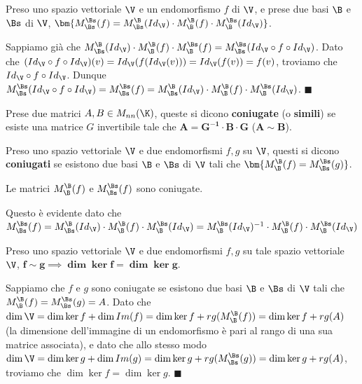 \documentclass[11pt, a4paper, titlepage, oneside]{scrbook}
\begin{document}
\begin{Osservazione}[]
\label{oss-matrice-diagonalizzata-M_C^C(f) = M M M}
Preso uno spazio vettoriale $\V$ e un endomorfismo $f$ di $\V$, e prese due basi $\B$ e $\Bs$ di $\V$, $\bm{M_\Bs^\Bs(f) = M_\Bs^\B(Id_\V) \cdot M_\B^\B(f) \cdot M_\B^\Bs(Id_\V)}$.
\end{Osservazione}

\Dimostrazione \nopagebreak

Sappiamo già che $M_\Bs^\B(Id_\V) \cdot M_\B^\B(f) \cdot M_\B^\Bs(f) = M_\Bs^\Bs(Id_\V \circ f \circ Id_\V)$. Dato che \mbox{$(Id_\V \circ f \circ Id_\V)(v)= Id_\V(f(Id_\V(v))) = Id_\V(f(v)) = f(v)$}, troviamo che $Id_\V \circ f \circ Id_\V$. Dunque $M_\Bs^\Bs(Id_\V \circ f \circ Id_\V) = M_\Bs^\Bs(f) = M_\Bs^\B(Id_\V) \cdot M_\B^\B(f) \cdot M_\B^\Bs(Id_\V)$. $\blacksquare$

\begin{Definizione}
\label{def-matrici-coniugate}
Prese due matrici $A, B \in M_{nn}(\K)$, queste si dicono \textbf{coniugate} (o \textbf{simili}) se esiste una matrice $G$ invertibile tale che $\bm{A = G^{-1} \cdot B \cdot G}$ ($\bm{A \sim B}$).
\end{Definizione}

\begin{Definizione}
\label{def-endomorfismi-coniugati}
Preso uno spazio vettoriale $\V$ e due endomorfismi $f,g$ su $\V$, questi si dicono \textbf{coniugati} se esistono due basi $\B$ e $\Bs$ di $\V$ tali che $\bm{M_\B^\B(f) = M_\Bs^\Bs(g)}$.
\end{Definizione}

\begin{Osservazione}[]
\label{oss-matrici-coniugate}
Le matrici $M_\B^\B(f)$ e $M_\Bs^\Bs(f)$ sono coniugate.
\end{Osservazione}
Questo è evidente dato che $M_\Bs^\Bs(f) = M_\Bs^\B(Id_\V) \cdot M_\B^\B(f) \cdot M_\B^\Bs(Id_\V) = M_\B^\Bs(Id_\V)^{-1} \cdot M_\B^\B(f) \cdot M_\B^\Bs(Id_\V)$

\begin{Proposizione}[]
\label{propos-dimensione-coniugate}
Preso uno spazio vettoriale $\V$ e due endomorfismi $f,g$ su tale spazio vettoriale $\V$, \mbox{$\bm{f \sim g } \implies \bm{\dim \ker f = \dim \ker g}$}.
\end{Proposizione}

\Dimostrazione \nopagebreak

Sappiamo che $f$ e $g$ sono coniugate se esistono due basi $\B$ e $\Bs$ di $\V$ tali che $M_\B^\B(f) = M_\Bs^\Bs(g) = A$. Dato che $\dim \V = \dim \ker f + \dim Im(f) = \dim \ker f + rg(M_\B^\B(f)) = \dim \ker f + rg(A)$ (la dimensione dell'immagine di un endomorfismo è pari al rango di una sua matrice associata), e dato che allo stesso modo $\dim \V = \dim \ker g + \dim Im(g) = \dim \ker g + rg(M_\Bs^\Bs(g)) = \dim \ker g + rg(A)$, troviamo che $\dim \ker f = \dim \ker g$. $\blacksquare$
\end{document}
